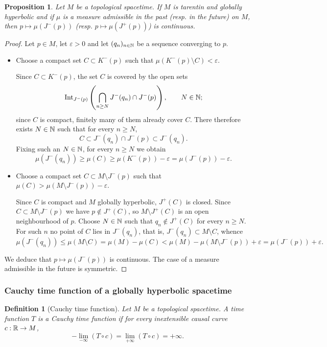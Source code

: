 \documentclass[a4paper,twoside]{article}
\newtheorem{prop}[lem]{Proposition}
\newtheorem{defi}[lem]{Definition}
\begin{document}
\begin{prop}\label{prop:cont_ext_cont}
Let $M$ be a topological spacetime. If $M$ is
tarentin and globally hyperbolic and if $\mu$ is a measure admissible in the past (resp. in the
future) on $M$, then $p\mapsto \mu(J^-(p))$ (resp. $p\mapsto \mu(J^+(p))$) is continuous.
\end{prop}
\begin{proof}Let $p\in M$, let $\varepsilon>0$ and let $(q_n)_{n\in \mathbb{N}}$ be a sequence converging to
$p$.
\begin{itemize}
\item  Choose a compact set $C\subset K^-(p)$ such that
$\mu(K^-(p)\setminus C)<\varepsilon$.

Since $C\subset K^-(p)$, the set $C$ is covered by the open sets $$\mathrm{Int}_{J^-(p)}\left(\bigcap_{n\geq N}J^-(q_n)\cap J^-(p)\right),\quad \quad N\in \mathbb{N};$$
since $C$ is compact, finitely many of them already cover $C$. There therefore exists
$N\in \mathbb{N}$ such that for every
$n\geq N$, $$C\subset J^-(q_n)\cap J^-(p) \subset J^-(q_n). $$
Fixing such an $N\in\mathbb{N}$, for every $n\geq N$ we obtain
$$\mu(J^-(q_n))  \geq \mu(C)\geq \mu(K^-(p))-\varepsilon=\mu(J^-(p))-\varepsilon.$$

\item Choose a compact set $C\subset M\setminus J^-(p)$ such that
$\mu(C)>\mu(M\setminus J^-(p))-\varepsilon$.

Since $C$ is compact and $M$ globally hyperbolic, $J^+(C)$ is closed.
Since $C\subset M\setminus J^-(p)$ we have $p\notin J^+(C)$, so
$M\setminus J^+(C)$ is an open neighbourhood of $p$. Choose $N\in \mathbb{N}$ such that $q_n\notin J^+(C)$ for every $n\geq N$.
For such $n$ no point of $C$ lies in $J^-(q_n)$, that is, $J^-(q_n)\subset M\setminus C$, whence
$$\mu(J^-(q_n))\leq \mu(M\setminus C)= \mu(M)-\mu(C)< \mu(M)-\mu(M\setminus J^-(p))+\varepsilon = \mu(J^-(p))+\varepsilon.$$
\end{itemize}
We deduce that $p\mapsto \mu(J^-(p))$ is continuous. The case of a measure admissible in the future is symmetric.
\end{proof}

\subsubsection{Cauchy time function of a globally hyperbolic spacetime}

\begin{defi}[Cauchy time function] Let $M$ be a topological spacetime. A time function $T$ is a Cauchy time function
if for every inextensible causal curve $c:\mathbb R\rightarrow M$,
$$-\lim_{-\infty} (T\circ c) = \lim_{+\infty}(T\circ c) = +\infty.$$
\end{defi}
\end{document}
